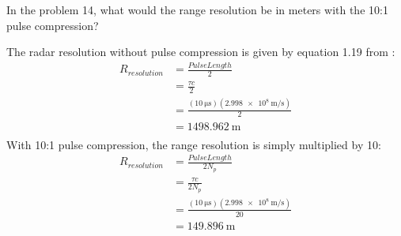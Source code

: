 \documentclass[12pt]{article}
\newcommand\SNR{\mathit{SNR}} %
\newenvironment{exercise}[2][Exercise]{\begin{trivlist}
    \item[\hskip \labelsep {\bfseries #1}\hskip \labelsep {\bfseries #2.}]}{\end{trivlist}}
\begin{document}
\begin{exercise}{14}
      

      \end{exercise}
      
      \begin{exercise}{15}
      In the problem 14, what would the range resolution be in meters with the 10:1 pulse compression?      

      The radar resolution without pulse compression is given by equation 1.19 from \cite[p.~29]{POMR}:
      \begin{align*}
      R_{resolution} & = \frac{PulseLength}{2}\\
      & = \frac{ \tau c }{2}\\
      & = \frac{ (\SI{10}{\us}) (\SI{2.998e8}{\meter\per\second}) }{2}\\
      & = \SI{1498.962}{\meter}\\
      \end{align*}
      With 10:1 pulse compression, the range resolution is simply multiplied by 10:
      \begin{align*}
      R_{resolution} & = \frac{PulseLength}{2 N_{p}}\\
      & = \frac{  \tau c }{2 N_{p}}\\
      & = \frac{ (\SI{10}{\us}) (\SI{2.998e8}{\meter\per\second}) }{20}\\
      & = \SI{149.896}{\meter}\\
      \end{align*}
      \end{exercise}
\end{document}
